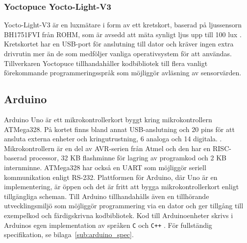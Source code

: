         \subsubsection{Yoctopuce Yocto-Light-V3} %
        \label{sub:yocto}
            Yocto-Light-V3 är en luxmätare i form av ett kretskort, baserad på ljussensorn BH1751FVI från ROHM, som är avsedd att mäta synligt ljus upp till 100 lux \cite{yocto}. Kretskortet har en USB-port för anslutning till dator och kräver ingen extra drivrutin mer än de som medföljer vanliga operativsystem för att användas. Tillverkaren Yoctopuce tillhandahåller kodbibliotek till flera vanligt förekommande programmeringsspråk som möjliggör avläsning av sensorvärden.
    \newpage
    \subsection{Arduino} %
    \label{ssub:arduino_uno}
        Arduino Uno är ett mikrokontrollerkort byggt kring mikrokontrollern ATMega328. På kortet finns bland annat USB-anslutning och 20 pins för att ansluta externa enheter och kringutrustning, 6 analoga och 14 digitala. \cite{ard_internals}. Mikrokontrollern är en del av AVR-serien från Atmel och den har en RISC-baserad processor, 32 KB flashminne för lagring av programkod och 2 KB internminne. ATMega328 har också en UART som möjliggör seriell kommunikation enligt RS-232. Plattformen för Arduino, där Uno är en implementering, är öppen och det är fritt att bygga mikrokontrollerkort enligt tillgängliga scheman. Till Arduino tillhandahålls även en tillhörande utvecklingsmiljö som möjliggör programmering via en dator och ger tillgång till exempelkod och färdigskrivna kodbibliotek. Kod till Arduinoenheter skrivs i Arduinos egen implementation av språken \texttt{C} och \texttt{C++} \cite{ard_c, ard_cplusplus}. För fullständig specifikation, se bilaga~\ref{sub:arduino_spec}.
